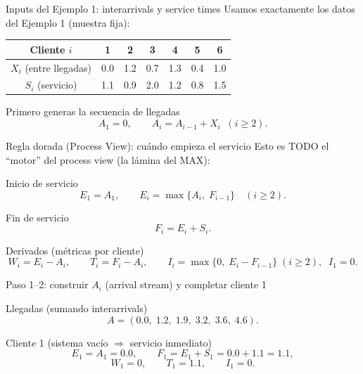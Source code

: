 \documentclass[aspectratio=1610, 9pt]{beamer}
\begin{document}
\begin{frame}{Inputs del Ejemplo 1: interarrivals y service times}
\small
Usamos exactamente los datos del Ejemplo 1 (muestra fija):

\setlength{\tabcolsep}{5pt}
\renewcommand{\arraystretch}{1.18}
\begin{table}
\centering
\scriptsize
\begin{tabular}{@{}ccccccc@{}}
\toprule
Cliente $i$ & 1 & 2 & 3 & 4 & 5 & 6\\
\midrule
$X_i$ (entre llegadas) & 0.0 & 1.2 & 0.7 & 1.3 & 0.4 & 1.0\\
$S_i$ (servicio)       & 1.1 & 0.9 & 2.0 & 1.2 & 0.8 & 1.5\\
\bottomrule
\end{tabular}
\end{table}

\vspace{4pt}
\begin{block}{Primero generas la secuencia de llegadas}
\[
A_1=0,\qquad A_i=A_{i-1}+X_i \;\;(i\ge 2).
\]
\end{block}
\end{frame}

\begin{frame}{Regla dorada (Process View): cuándo empieza el servicio}
\small
Esto es TODO el “motor” del process view (la lámina del MAX):

\vspace{4pt}
\begin{block}{Inicio de servicio}
\[
E_1=A_1,\qquad
E_i=\max\{A_i,\;F_{i-1}\}\quad (i\ge 2).
\]
\end{block}

\vspace{2pt}
\begin{block}{Fin de servicio}
\[
F_i = E_i + S_i.
\]
\end{block}

\vspace{2pt}
\begin{block}{Derivados (métricas por cliente)}
\[
W_i=E_i-A_i,\qquad
T_i=F_i-A_i,\qquad
I_i=\max\{0,\;E_i-F_{i-1}\}\;(i\ge 2),\;\; I_1=0.
\]
\end{block}
\end{frame}

\begin{frame}{Paso 1–2: construir $A_i$ (arrival stream) y completar cliente 1}
\small
\begin{block}{Llegadas (sumando interarrivals)}
\[
A=(0.0,\;1.2,\;1.9,\;3.2,\;3.6,\;4.6).
\]
\end{block}

\vspace{4pt}
\begin{block}{Cliente 1 (sistema vacío $\Rightarrow$ servicio inmediato)}
\[
E_1=A_1=0.0,\qquad
F_1=E_1+S_1=0.0+1.1=1.1,
\]
\[
W_1=0,\qquad T_1=1.1,\qquad I_1=0.
\]
\end{block}
\end{frame}
\end{document}
